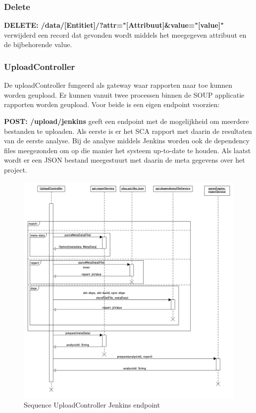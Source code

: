 \subsubsection*{Delete}
\textbf{DELETE: /data/[Entitiet]/?attr="[Attribuut]\&value="[value]"} verwijderd een record dat gevonden wordt middels het meegegeven attribuut en de bijbehorende value.


\subsubsection{UploadController}
De uploadController fungeerd als gateway waar rapporten naar toe kunnen worden geupload. Er kunnen vanuit twee processen binnen de SOUP applicatie rapporten worden geupload. Voor beide is een eigen endpoint voorzien:

\textbf{POST: /upload/jenkins} geeft een endpoint met de mogelijkheid om meerdere bestanden te uploaden. Als eerste is er het SCA rapport met daarin de resultaten van de eerste analyse. Bij de analyse middels Jenkins worden ook de dependency files meegezonden om op die manier het systeem up-to-date te houden. Als laatst wordt er een JSON bestand meegestuurt met daarin de meta gegevens over het project.

\begin{figure}[bth]
    \myfloatalign
    \includegraphics[width=12cm]{gfx/umlet/exports/SequploadController-Jenkins}
    \caption{Sequence UploadController Jenkins endpoint}
    \label{fig:SequenceUploadReportJenkins}
\end{figure}

